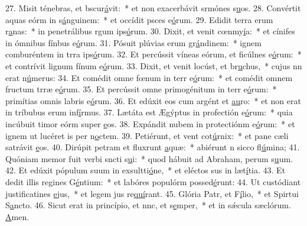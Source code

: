 27. Misit ténebras, et bscur\uline{á}vit:~* et non exacerbávit srmónes s\uline{u}os.
28. Convértit aquas eórm in s\uline{á}nguinem:~* et occídit psces e\uline{ó}rum.
29. Edidit terra erum r\uline{a}nas:~* in penetrálibus rgum ips\uline{ó}rum.
30. Dixit, et venit cœnmy\uline{í}a:~* et cínifes in ómnibus fínbus e\uline{ó}rum.
31. Pósuit plúvias erum gr\uline{á}ndinem:~* ignem comburéntem in trra ips\uline{ó}rum.
32. Et percússit víneas eórum, et ficúlnes e\uline{ó}rum:~* et contrívit lignum fínum e\uline{ó}rum.
33. Dixit, et venit locúst, et br\uline{u}chus,~* cujus nn erat n\uline{ú}merus:
34. Et comédit omne fœnum in terr e\uline{ó}rum:~* et comédit omnem fructum trræ e\uline{ó}rum.
35. Et percússit omne primogénitum in terr e\uline{ó}rum:~* primítias omnis labris e\uline{ó}rum.
36. Et edúxit eos cum argént et \uline{au}ro:~* et non erat in tríbubus erum inf\uline{í}rmus.
37. Lætáta est Ægýptus in profectión e\uline{ó}rum:~* quia incúbuit timor eórm super \uline{e}os.
38. Expándit nubem in protectiónm e\uline{ó}rum:~* et ignem ut lucéret is per n\uline{o}ctem.
39. Petiérunt, et vent cot\uline{ú}rnix:~* et pane cæli satrávit \uline{e}os.
40. Dirúpit petram et fluxrunt \uline{a}quæ:~* abiérunt n sicco fl\uline{ú}mina;
41. Quóniam memor fuit verbi sncti s\uline{u}i:~* quod hábuit ad Abraham, perum s\uline{u}um.
42. Et edúxit pópulum suum in exsultti\uline{ó}ne,~* et eléctos sus in læt\uline{í}tia.
43. Et dedit illis regines G\uline{é}ntium:~* et labóres populórm possed\uline{é}runt:
44. Ut custódiant justificatines \uline{e}jus,~* et legem jus re\uline{quí}rant.
45. Glória Patr, et F\uline{í}lio,~* et Spirtui S\uline{a}ncto.
46. Sicut erat in princípio, et nnc, et s\uline{e}mper,~* et in sǽcula sæclórum. \uline{A}men.
